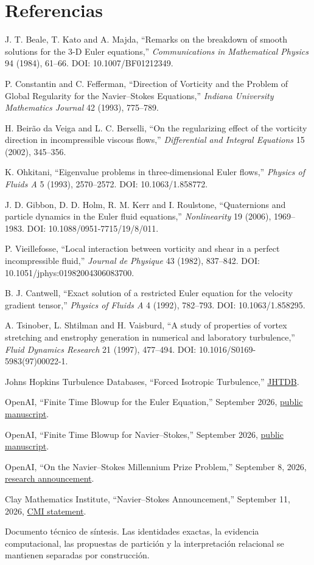 \documentclass[11pt]{article}
\begin{document}
\section*{Referencias}
\small
\begin{enumerate}[leftmargin=1.6em,label={[\arabic*]}]
\item J. T. Beale, T. Kato and A. Majda, ``Remarks on the breakdown of smooth solutions for the 3-D Euler equations,'' \emph{Communications in Mathematical Physics} 94 (1984), 61--66. DOI: 10.1007/BF01212349.
\item P. Constantin and C. Fefferman, ``Direction of Vorticity and the Problem of Global Regularity for the Navier--Stokes Equations,'' \emph{Indiana University Mathematics Journal} 42 (1993), 775--789.
\item H. Beirão da Veiga and L. C. Berselli, ``On the regularizing effect of the vorticity direction in incompressible viscous flows,'' \emph{Differential and Integral Equations} 15 (2002), 345--356.
\item K. Ohkitani, ``Eigenvalue problems in three-dimensional Euler flows,'' \emph{Physics of Fluids A} 5 (1993), 2570--2572. DOI: 10.1063/1.858772.
\item J. D. Gibbon, D. D. Holm, R. M. Kerr and I. Roulstone, ``Quaternions and particle dynamics in the Euler fluid equations,'' \emph{Nonlinearity} 19 (2006), 1969--1983. DOI: 10.1088/0951-7715/19/8/011.
\item P. Vieillefosse, ``Local interaction between vorticity and shear in a perfect incompressible fluid,'' \emph{Journal de Physique} 43 (1982), 837--842. DOI: 10.1051/jphys:01982004306083700.
\item B. J. Cantwell, ``Exact solution of a restricted Euler equation for the velocity gradient tensor,'' \emph{Physics of Fluids A} 4 (1992), 782--793. DOI: 10.1063/1.858295.
\item A. Tsinober, L. Shtilman and H. Vaisburd, ``A study of properties of vortex stretching and enstrophy generation in numerical and laboratory turbulence,'' \emph{Fluid Dynamics Research} 21 (1997), 477--494. DOI: 10.1016/S0169-5983(97)00022-1.
\item Johns Hopkins Turbulence Databases, ``Forced Isotropic Turbulence,'' \href{https://turbulence.pha.jhu.edu/Forced_isotropic_turbulence.aspx}{JHTDB}.
\item OpenAI, ``Finite Time Blowup for the Euler Equation,'' September 2026, \href{https://cdn.openai.com/pdf/315b36cd-ec98-4023-8342-93345194ece1/euler.pdf}{public manuscript}.
\item OpenAI, ``Finite Time Blowup for Navier--Stokes,'' September 2026, \href{https://cdn.openai.com/pdf/32d9f210-8b73-45e0-91bc-82a30aef8a9a/navier-stokes.pdf}{public manuscript}.
\item OpenAI, ``On the Navier--Stokes Millennium Prize Problem,'' September 8, 2026, \href{https://openai.com/index/navier-stokes-solution/}{research announcement}.
\item Clay Mathematics Institute, ``Navier--Stokes Announcement,'' September 11, 2026, \href{https://www.claymath.org/news/navier-stokes-announcement/}{CMI statement}.
\end{enumerate}

\vfill
\begin{center}
\small\color{muted}
Documento técnico de síntesis. Las identidades exactas, la evidencia computacional, las propuestas de partición y la interpretación relacional se mantienen separadas por construcción.
\end{center}
\end{document}
